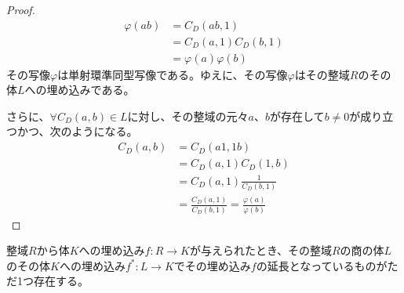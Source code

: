 \documentclass[dvipdfmx]{jsarticle}
\begin{document}
\begin{proof}
\begin{align*}
\varphi(ab) &= C_{D}(ab,1)\\
&= C_{D}(a,1)C_{D}(b,1)\\
&= \varphi(a)\varphi(b)
\end{align*}
その写像$\varphi$は単射環準同型写像である。ゆえに、その写像$\varphi$はその整域$R$のその体$L$への埋め込みである。\par
さらに、$\forall C_{D}(a,b) \in L$に対し、その整域の元々$a$、$b$が存在して$b \neq 0$が成り立つかつ、次のようになる。
\begin{align*}
C_{D}(a,b) &= C_{D}(a1,1b)\\
&= C_{D}(a,1)C_{D}(1,b)\\
&= C_{D}(a,1)\frac{1}{C_{D}(b,1)}\\
&= \frac{C_{D}(a,1)}{C_{D}(b,1)} = \frac{\varphi(a)}{\varphi(b)}
\end{align*}
\end{proof}
\begin{thm}\label{3.3.2.34}
整域$R$から体$K$への埋め込み$f:R \rightarrow K$が与えられたとき、その整域$R$の商の体$L$のその体$K$への埋め込み$f^{*}:L \rightarrow K$でその埋め込み$f$の延長となっているものがただ1つ存在する。
\end{thm}
\end{document}
